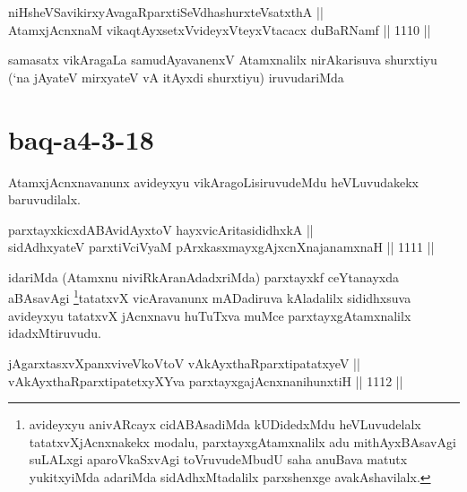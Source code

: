
\begin{shl}
niHsheVSavikirxyAvagaRparxtiSeVdhashurxteVsatxthA || \\
AtamxjAcnxnaM vikaqtAyx\s \s setxV\s videyxVteyxVtacacx duBaRNamf ||  1110 ||  
\end{shl}

\begin{artha}
samasatx vikAragaLa samudAyavanenxV Atamxnalilx nirAkarisuva shurxtiyu (`na jAyateV mirxyateV vA itAyxdi shurxtiyu) iruvudariMda
\end{artha}

\section*{baq-a4-3-18}

\begin{artha}
AtamxjAcnxnavanunx avideyxyu vikAragoLisiruvudeMdu heVLuvudakekx baruvudilalx.
\end{artha}


\begin{shl}
parxtayxkicxdABAvidAyx\s toV hayxvicAritasididhxkA || \\
sidAdhxyateV parxtiVciVyaM pArxkasxmayxgAjxcnXnajanamxnaH ||  1111 || 
\end{shl}

\begin{artha}
idariMda (Atamxnu niviRkAranAdadxriMda) parxtayxkf ceYtanayxda aBAsavAgi \footnote{avideyxyu anivARcayx cidABAsadiMda kUDidedxMdu heVLuvudelalx tatatxvXjAcnxnakekx modalu, parxtayxgAtamxnalilx adu mithAyxBAsavAgi suLALxgi aparoVkaSxvAgi toVruvudeMbudU saha anuBava matutx yukitxyiMda adariMda sidAdhxMtadalilx parxshenxge avakAshavilalx.}tatatxvX vicAravanunx mADadiruva kAladalilx sididhxsuva avideyxyu tatatxvX jAcnxnavu huTuTxva muMce parxtayxgAtamxnalilx idadxMtiruvudu.
\end{artha}


\begin{shl}
jAgarxtasxvXpanxviveVkoV\s toV vAkAyxthaRparxtipatatxyeV || \\
vAkAyxthaRparxtipatetxyXYva parxtayxgajAcnxnanihunxtiH ||  1112 ||  
\end{shl}


